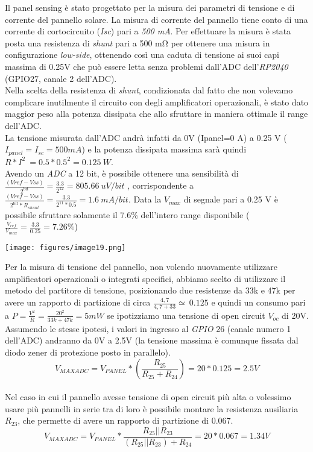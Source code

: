 \noindent Il panel sensing è stato progettato per la misura dei parametri di
tensione e di corrente del pannello solare. La misura di corrente del
pannello tiene conto di una corrente di cortocircuito (\emph{Isc}) pari
a \emph{500 mA}. Per effettuare la misura è stata posta una resistenza
di \textit{shunt} pari a 500 mΩ per ottenere una misura in configurazione \emph{low-side},
ottenendo così una caduta di tensione ai suoi capi massima di 0.25V che
può essere letta senza problemi dall'ADC dell'\textit{RP2040} (GPIO27, canale 2
dell'ADC).\\
Nella scelta della resistenza di \textit{shunt}, condizionata dal fatto che non
volevamo complicare inutilmente il circuito con degli amplificatori
operazionali, è stato dato maggior peso alla potenza dissipata che allo
sfruttare in maniera ottimale il range dell'ADC.\\
La tensione misurata dall'ADC andrà infatti da 0V (Ipanel=0 A) a 0.25 V
($I_{panel}=I_{sc}=500 mA$) e la potenza dissipata massima sarà quindi
\(R*I^{2}\  = 0.5*0.5^{2} = 0.125\ W\).\\
Avendo un \emph{ADC} a 12 bit, è possibile ottenere una sensibilità di
\(\frac{(Vref - Vss)}{2^{\text{bit}}} = \frac{3.3}{2^{12}} = 805.66\ uV/bit\)
, corrispondente a
\(\frac{(Vref - Vss)}{2^{\text{bit}}*R_{shunt}} = \frac{3.3}{2^{11}*0.5} = 1.6\ mA/bit\).
Data la $V_{max}$ di segnale pari a 0.25 V è possibile sfruttare solamente il
7.6\% dell'intero range disponibile
(\(\frac{V_{ref}}{V_{max}} = \frac{3.3}{0.25} = 7.26\%\))

\begin{center}
\texttt{[image: figures/image19.png]}
\captionsetup{type=figure}
\end{center}

\noindent Per la misura di tensione del pannello, non volendo nuovamente
utilizzare amplificatori operazionali o integrati specifici, abbiamo
scelto di utilizzare il metodo del partitore di tensione, posizionando
due resistenze da 33k e 47k per avere un rapporto di partizione di circa
\(\frac{4,7}{4,7 + 33} \simeq \ 0.125\) e quindi un consumo pari a 
\(P=\frac{V^{2}}{R}=\frac{20^{2}}{33k+47k}=5mW\)
se ipotizziamo una tensione di open circuit $V_{oc}$ di 20V.\\
Assumendo le stesse ipotesi, i valori in ingresso al
\textit{GPIO} 26 (canale numero 1 dell'ADC) andranno da 0V a 2.5V (la tensione
massima è comunque fissata dal diodo zener di protezione posto in
parallelo).\\
\[V_{MAXADC}=V_{PANEL}*(\frac{R_{25}}{R_{25}+R_{24}})=20*0.125 =2.5 V\]\\
Nel caso in cui il pannello avesse tensione di open circuit più alta o
volessimo usare più pannelli in serie tra di loro è possibile montare la
resistenza ausiliaria $R_{23}$, che permette di avere un rapporto di
partizione di 0.067.\\
\[V_{MAXADC}=V_{PANEL}*\frac{R_{25}||R_{23}}{(R_{25}||R_{23})+R_{24}}=20*0.067 =1.34 V \]

